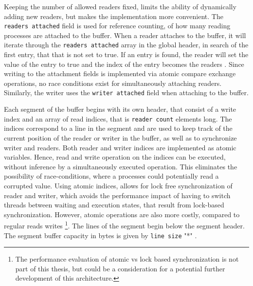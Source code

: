 Keeping the number of allowed readers fixed, limits the ability of dynamically adding new readers, but makes the implementation more convenient. The \texttt{readers attached} field is used for
reference counting, of how many reading processes are attached to the buffer. When a reader attaches to the buffer, it will iterate through the \texttt{readers attached} array in the global header, in search of the first entry, that that is not
set to true. If an entry is found, the reader will set the value of the entry to true and the index of the entry becomes the readers . Since writing to the attachment fields 
is implemented via atomic compare exchange operations, no race conditions exist for simultaneously attaching readers. Similarly, the writer uses the \texttt{writer attached} field when attaching to the buffer.
\par
Each segment of the buffer begins with its own header, that consist of a write index and an array of read indices, that is \texttt{reader count} elements long.
The indices correspond to a line in the segment and are used to keep track of the current position of the reader or writer in the buffer, as well
as to synchronize writer and readers. Both reader and writer indices are implemented as atomic variables. Hence, read and write operation 
on the indices can be executed, without inference by a simultaneously executed operation. This eliminates the possibility of race-conditions, where a processes could potentially read a corrupted value. Using atomic indices, allows for lock free synchronization of reader and writer, which avoids the performance impact of having to
switch threads between waiting and execution states, that result from lock-based synchronization. However, atomic operations are also more costly, compared to regular reads writes \footnote{The performance evaluation of atomic vs lock based synchronization is not part of this thesis, but could be a consideration for a potential further development of this architecture.}. 
The lines of the segment begin below the segment header. The segment buffer capacity in bytes is given by \texttt{line size} "*" .  

